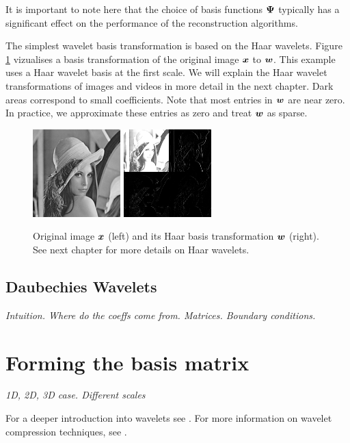 It is important to note here that the choice of basis functions $\boldsymbol \Psi$ typically has a significant effect on the performance of the reconstruction algorithms.

The simplest wavelet basis transformation is based on the Haar wavelets.
Figure \ref{fig:haarlenna} vizualises a basis transformation of the original image $\boldsymbol x$ to $\boldsymbol w$. 
This example uses a Haar wavelet basis at the first scale.
We will explain the Haar wavelet transformations of images and videos in more detail in the next chapter.
Dark areas correspond to small coefficients.
Note that most entries in $\boldsymbol w$ are near zero. 
In practice, we approximate these entries as zero and treat $\boldsymbol w$ as sparse.

\begin{figure}
\label{fig:haarlenna}
\center
\includegraphics{128.png}
\includegraphics{haar.png}
\caption{Original image $\boldsymbol x$ (left) and its Haar basis transformation $\boldsymbol w$ (right). See next chapter for more details on Haar wavelets.}
\end{figure}

\subsection{Daubechies Wavelets}
\emph{Intuition. Where do the coeffs come from. Matrices. Boundary conditions.}


\section{Forming the basis matrix}
\emph{1D, 2D, 3D case. Different scales}

For a deeper introduction into wavelets see \cite{stollnitz1995}.
For more information on wavelet compression techniques, see \cite{devore1992}.

